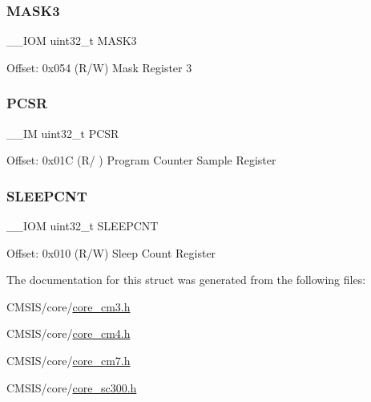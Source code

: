 \subsubsection{\texorpdfstring{M\+A\+S\+K3}{MASK3}}
{\footnotesize\ttfamily \+\_\+\+\_\+\+I\+OM uint32\+\_\+t M\+A\+S\+K3}

Offset\+: 0x054 (R/W) Mask Register 3 \mbox{\label{struct_d_w_t___type_a72e52fffe9ac6af0ee15877e2d5dac41}} 
\subsubsection{\texorpdfstring{P\+C\+SR}{PCSR}}
{\footnotesize\ttfamily \+\_\+\+\_\+\+IM uint32\+\_\+t P\+C\+SR}

Offset\+: 0x01C (R/ ) Program Counter Sample Register \mbox{\label{struct_d_w_t___type_aafa1400cd3168b21652b86599ad3ed83}} 
\subsubsection{\texorpdfstring{S\+L\+E\+E\+P\+C\+NT}{SLEEPCNT}}
{\footnotesize\ttfamily \+\_\+\+\_\+\+I\+OM uint32\+\_\+t S\+L\+E\+E\+P\+C\+NT}

Offset\+: 0x010 (R/W) Sleep Count Register 

The documentation for this struct was generated from the following files\+:\begin{DoxyCompactItemize}
\item 
C\+M\+S\+I\+S/core/\hyperlink{core__cm3_8h}{core\+\_\+cm3.\+h}\item 
C\+M\+S\+I\+S/core/\hyperlink{core__cm4_8h}{core\+\_\+cm4.\+h}\item 
C\+M\+S\+I\+S/core/\hyperlink{core__cm7_8h}{core\+\_\+cm7.\+h}\item 
C\+M\+S\+I\+S/core/\hyperlink{core__sc300_8h}{core\+\_\+sc300.\+h}\end{DoxyCompactItemize}
